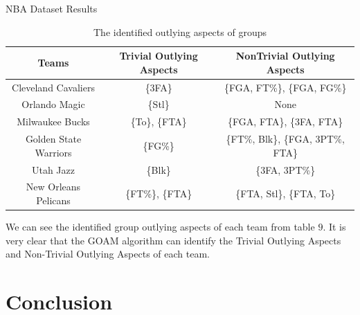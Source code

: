 \documentclass[
 size=14pt,
 paper=smartboard,  %
 mode=present, 		%
 display=slides, 	%
 style=tuliplab,  	%
 pauseslide,
 fleqn,leqno]{powerdot}
\begin{document}
\begin{slide}[toc=,bm=]{NBA Dataset Results}

\begin{table}[htbp]
\setlength{\abovecaptionskip}{0pt}
\setlength{\belowcaptionskip}{10pt}
\centering
\caption{The identified outlying aspects of groups}

\begin{tabular}{ccc}
\hline
  Teams                   & Trivial Outlying Aspects  & NonTrivial Outlying Aspects    \\
\hline
  Cleveland Cavaliers     & \{3FA\}                   & \{FGA, FT\%\}, \{FGA, FG\%\} \\
  Orlando Magic           & \{Stl\}                   & None                         \\
  Milwaukee Bucks         & \{To\}, \{FTA\}           & \{FGA, FTA\}, \{3FA, FTA\}     \\
  Golden State Warriors   & \{FG\%\}                  & \{FT\%, Blk\}, \{FGA, 3PT\%, FTA\}\\
  Utah Jazz               & \{Blk\}                   & \{3FA, 3PT\%\}                    \\
  New Orleans Pelicans    & \{FT\%\}, \{FTA\}         & \{FTA, Stl\}, \{FTA, To\}          \\
\hline
\end{tabular}
\end{table}

\begin{note}
We can see the identified group outlying aspects of each team from table $9$.
It is very clear that the GOAM algorithm can identify the
Trivial Outlying Aspects and Non-Trivial Outlying Aspects of each team.
\end{note}

\end{slide}


\section{Conclusion}
\end{document}
